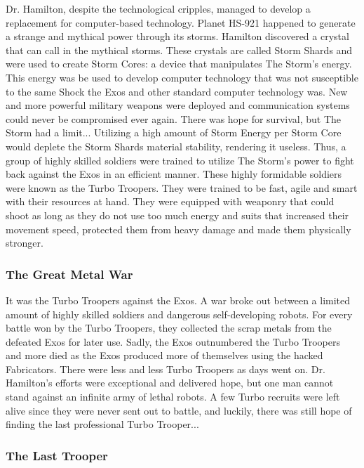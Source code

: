 \documentclass[12pt]{article}
\begin{document}
Dr. Hamilton, despite the technological cripples, managed to develop a replacement for computer-based technology. Planet HS-921 happened to generate a strange and mythical power through its storms. Hamilton  discovered a crystal that can call in the mythical storms. These crystals are called Storm Shards and were used to create Storm Cores: a device that manipulates The Storm's energy. This energy was be used to develop computer technology that was not susceptible to the same Shock the Exos and other standard computer technology was. New and more powerful military weapons were deployed and communication systems could never be compromised ever again. There was hope for survival, but The Storm had a limit... Utilizing a high amount of Storm Energy per Storm Core would deplete the Storm Shards material stability, rendering it useless. Thus, a group of highly skilled soldiers were trained to utilize The Storm's power to fight back against the Exos in an efficient manner. These highly formidable soldiers were known as the Turbo Troopers. They were trained to be fast, agile and smart with their resources at hand. They were equipped with weaponry that could shoot as long as they do not use too much energy and suits that increased their movement speed, protected them from heavy damage and made them physically stronger. 

\subsubsection{The Great Metal War}

It was the Turbo Troopers against the Exos. A war broke out between a limited amount of highly skilled soldiers and dangerous self-developing robots. For every battle won by the Turbo Troopers, they collected the scrap metals from the defeated Exos for later use. Sadly, the Exos outnumbered the Turbo Troopers and more died as the Exos produced more of themselves using the hacked Fabricators. There were less and less Turbo Troopers as days went on. Dr. Hamilton's efforts were exceptional and delivered hope, but one man cannot stand against an infinite army of lethal robots. A few Turbo recruits were left alive since they were never sent out to battle, and luckily, there was still hope of finding the last professional Turbo Trooper...

\subsubsection{The Last Trooper}
\end{document}
